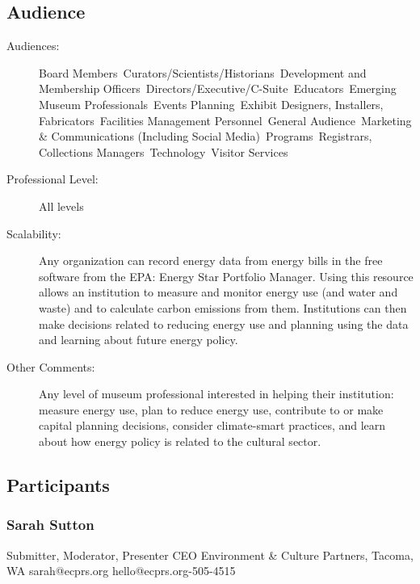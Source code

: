 \documentclass{report}
\begin{document}
              \subsection*{Audience}
                \begin{description}
                  \item [Audiences:]Board Members~Curators/Scientists/Historians~Development and Membership Officers~Directors/Executive/C-Suite~Educators~Emerging Museum Professionals~Events Planning~Exhibit Designers, Installers, Fabricators~Facilities Management Personnel~General Audience~Marketing \& Communications (Including Social Media)~Programs~Registrars, Collections Managers~Technology~Visitor Services~
                  \item[Professional Level:]All levels~
                \item[Scalability:] Any organization can record energy data from energy bills in the free software from the EPA: Energy Star Portfolio Manager. Using this resource allows an institution to measure and monitor energy use (and water and waste) and to calculate carbon emissions from them. Institutions can then make decisions related to reducing energy use and planning using the data and learning about future energy policy.

							
              \item[Other Comments:] Any level of museum professional interested in helping their institution: measure energy use, plan to reduce energy use, contribute to or make capital planning decisions, consider climate-smart practices, and learn about how energy policy is related to the cultural sector.
              \end{description}
            \subsection*{Participants}
              \subsubsection*{ Sarah Sutton }
              Submitter, Moderator, Presenter\newline
              CEO\newline
              Environment \& Culture Partners, Tacoma, WA
              \newline
              sarah@ecprs.org\newline
              hello@ecprs.org-505-4515\newline
\end{document}

